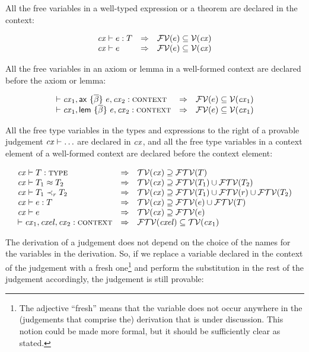 All the free variables in a well-typed expression or a theorem are declared in
the context:

\begin{theorem}\label{thm-free-var-in-cx}
\[
\begin{array}{l@{\ \ \IMPLIES\ \ }l}
\hastyO{\expr}{\typ} & \efvar{\expr}\subseteq\cxvarO \\
\theoO{\expr}        & \efvar{\expr}\subseteq\cxvarO
\end{array}
\]
\end{theorem}

All the free variables in an axiom or lemma in a well-formed context are
declared before the axiom or lemma:

\begin{theorem}\label{thm-free-var-in-prev-cx}
\[
\begin{array}{l@{\ \ \IMPLIES\ \ }l}
\cxwf{\cx_1,\axO, \cx_2} & \efvar{\expr}\subseteq\cxvar{\cx_1} \\
\cxwf{\cx_1,\lemO,\cx_2} & \efvar{\expr}\subseteq\cxvar{\cx_1}
\end{array}
\]
\end{theorem}

All the free type variables in the types and expressions to the right of a
provable judgement $\mathit{cx}\vdash\ldots$ are declared in $\mathit{cx}$, and all the free
type variables in a context element of a well-formed context are declared
before the context element:

\begin{theorem}\label{thm-free-tvar-in-cx}
\[
\begin{array}{l@{\ \ \IMPLIES\ \ }l}
\istyO{\typ} &
 \cxtvarO\supseteq\ftvar{\typ} \\
\teqO{\typ_1}{\typ_2} &
 \cxtvarO\supseteq\ftvar{\typ_1}\cup\ftvar{\typ_2} \\
\issubO{\typ_1}{\tspred}{\typ_2} &
 \cxtvarO\supseteq\ftvar{\typ_1}\cup\ftvar{\tspred}\cup\ftvar{\typ_2} \\
\hastyO{\expr}{\typ} &
 \cxtvarO\supseteq\ftvar{\expr}\cup\ftvar{\typ} \\
\theoO{\expr} &
 \cxtvarO\supseteq\ftvar{\expr} \\
\cxwf{\cx_1,\cxel,\cx_2} &
 \ftvar{\cxel}\subseteq\cxtvar{\cx_1}
\end{array}
\]
\end{theorem}

The derivation of a judgement does not depend on the choice of the names for
the variables in the derivation. So, if we replace a variable declared in the
context of the judgement with a fresh one\footnote{The adjective ``fresh''
means that the variable does not occur anywhere in the (judgements that
comprise the) derivation that is under discussion. This notion could be made
more formal, but it should be sufficiently clear as stated.} and perform the
substitution in the rest of the judgement accordingly, the judgement is still
provable:

